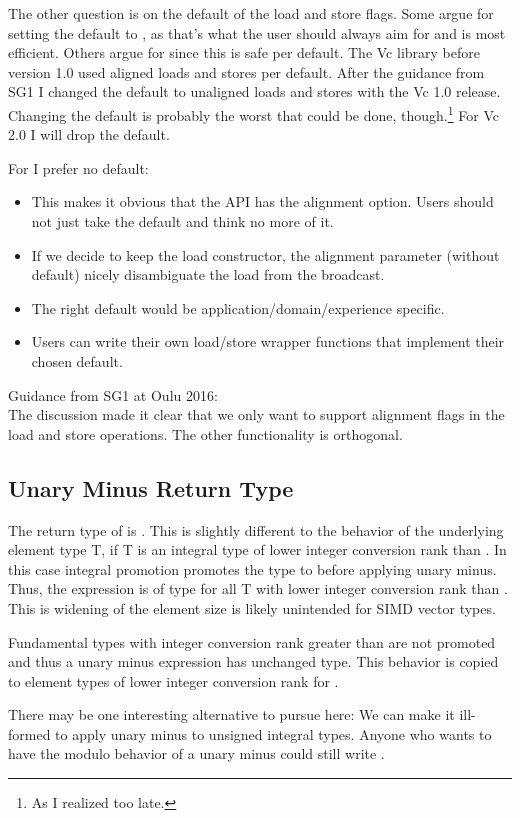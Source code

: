 The other question is on the default of the load and store flags.
Some argue for setting the default to , as that's what the user should always aim for and is most efficient.
Others argue for  since this is safe per default.
The Vc library before version 1.0 used aligned loads and stores per default.
After the guidance from SG1 I changed the default to unaligned loads and stores with the Vc 1.0 release.
Changing the default is probably the worst that could be done, though.\footnote{As I realized too late.}
For Vc 2.0 I will drop the default.

For \datapar I prefer no default:
\begin{itemize}
  \item This makes it obvious that the API has the alignment option.
    Users should not just take the default and think no more of it.
  \item If we decide to keep the load constructor, the alignment parameter (without default) nicely disambiguate the load from the broadcast.
  \item The right default would be application/domain/experience specific.
  \item Users can write their own load/store wrapper functions that implement their chosen default.
\end{itemize}

Guidance from SG1 at Oulu 2016:\\
The discussion made it clear that we only want to support alignment flags in the load and store operations.
The other functionality is orthogonal.

\subsection{Unary Minus Return Type}\label{sec:unary minus}
The return type of  is .
This is slightly different to the behavior of the underlying element type \type T, if \type T is an integral type of lower integer conversion rank than \intt.
In this case integral promotion promotes the type to \intt before applying unary minus.
Thus, the expression  is of type \intt for all \type T with lower integer conversion rank than \intt.
This is widening of the element size is likely unintended for SIMD vector types.

Fundamental types with integer conversion rank greater than \intt are not promoted and thus a unary minus expression has unchanged type.
This behavior is copied to element types of lower integer conversion rank for \datapar.

There may be one interesting alternative to pursue here:
We can make it ill-formed to apply unary minus to unsigned integral types.
Anyone who wants to have the modulo behavior of a unary minus could still write .

